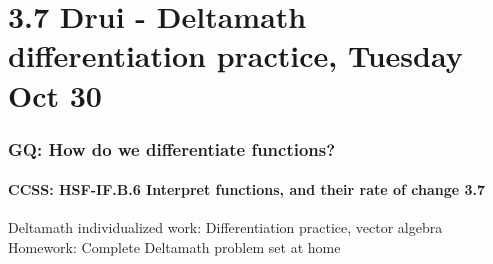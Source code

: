\documentclass{beamer}
\begin{document}
\section{3.7 Drui - Deltamath differentiation practice, Tuesday Oct 30}
  \frame
  {
    \frametitle{GQ: How do we differentiate functions?}
    \framesubtitle{CCSS: HSF-IF.B.6 Interpret functions, and their rate of change  \alert{3.7}}


    Deltamath individualized work: Differentiation practice, vector algebra \\ \bigskip
    Homework: Complete Deltamath problem set at home
  }
\end{document}
